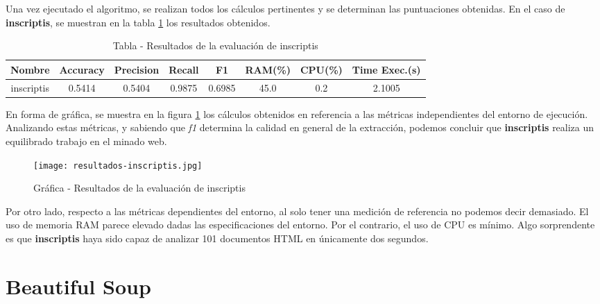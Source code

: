Una vez ejecutado el algoritmo, se realizan todos los cálculos pertinentes y se determinan las puntuaciones
obtenidas. En el caso de \textbf{inscriptis}, se muestran en la tabla
\ref{tab:tabla - resultados de la evaluacion de inscriptis} los resultados obtenidos.

\begin{table}[h]
    \begin{center}
      \begin{tabular}{| c | c | c | c | c | c | c | c |} \hline 
       \textbf{Nombre} & \textbf{Accuracy} & \textbf{Precision}  & \textbf{Recall} & \textbf{F1} & \textbf{RAM(\%)} & \textbf{CPU(\%)} & \textbf{Time Exec.(s)} \\ \hline
       inscriptis & 0.5414 & 0.5404 & 0.9875 & 0.6985 & 45.0 & 0.2 & 2.1005 \\ \hline
      \end{tabular}
      \caption{Tabla - Resultados de la evaluación de inscriptis}
      \label{tab:tabla - resultados de la evaluacion de inscriptis}
    \end{center}
\end{table} 

En forma de gráfica, se muestra en la figura \ref{img:grafica - resultados de la evaluacion de inscriptis}
los cálculos obtenidos en referencia a las métricas independientes del entorno de ejecución. Analizando
estas métricas, y sabiendo que \emph{f1} determina la calidad en general de la extracción, podemos concluir
que \textbf{inscriptis} realiza un equilibrado trabajo en el minado web.

\begin{figure}[tphb]
    \centering
    \texttt{[image: resultados-inscriptis.jpg]}
    \caption{Gráfica - Resultados de la evaluación de inscriptis}
    \label{img:grafica - resultados de la evaluacion de inscriptis}
\end{figure}

Por otro lado, respecto a las métricas dependientes del entorno, al solo tener una medición de referencia 
no podemos decir demasiado. El uso de memoria RAM parece elevado dadas las especificaciones del entorno. 
Por el contrario, el uso de CPU es mínimo. Algo sorprendente es que \textbf{inscriptis} haya sido capaz de 
analizar 101 documentos HTML en únicamente dos segundos.

\section*{Beautiful Soup}

